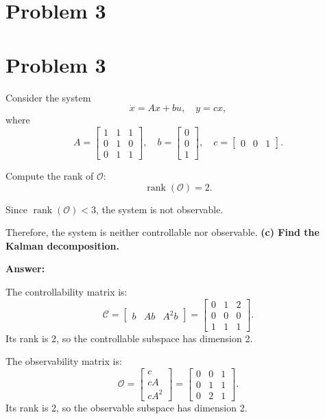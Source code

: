 \documentclass[12pt]{article}
\begin{document}
\section*{Problem 3}
\section*{Problem 3}

Consider the system
\[
\dot{x} = Ax + bu, \quad y = cx,
\]
where
\[
A = \begin{bmatrix}
1 & 1 & 1 \\
0 & 1 & 0 \\
0 & 1 & 1
\end{bmatrix}, \quad
b = \begin{bmatrix}
0 \\ 0 \\ 1
\end{bmatrix}, \quad
c = \begin{bmatrix}
0 & 0 & 1
\end{bmatrix}.
\]

Compute the rank of \(\mathcal{O}\):
\[
\operatorname{rank}(\mathcal{O}) = 2.
\]

Since \(\operatorname{rank}(\mathcal{O}) < 3\), the system is not observable.

Therefore, the system is neither controllable nor observable. 
\textbf{(c) Find the Kalman decomposition.}

\textbf{Answer:}

The controllability matrix is:
\[
\mathcal{C} = \begin{bmatrix} b & Ab & A^2b \end{bmatrix} = \begin{bmatrix}
0 & 1 & 2 \\
0 & 0 & 0 \\
1 & 1 & 1
\end{bmatrix}.
\]
Its rank is 2, so the controllable subspace has dimension 2.

The observability matrix is:
\[
\mathcal{O} = \begin{bmatrix} c \\ cA \\ cA^2 \end{bmatrix} = \begin{bmatrix}
0 & 0 & 1 \\
0 & 1 & 1 \\
0 & 2 & 1
\end{bmatrix}.
\]
Its rank is 2, so the observable subspace has dimension 2.
\end{document}
